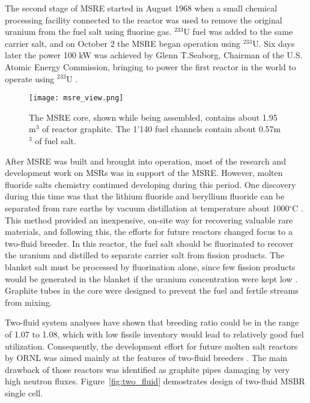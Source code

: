 The second stage of \gls{MSRE} started in August 1968 when a small chemical processing facility connected to the reactor was used to remove the original uranium from the fuel salt using fluorine gas. $^{233}$U fuel was added to the same carrier salt, and on October 2 the \gls{MSRE} began operation using $^{233}$U. Six days later the power 100 kW was achieved by Glenn T.Seaborg, Chairman of the U.S. Atomic Energy Commission, bringing to power the first reactor in the world to operate using $^{233}$U \cite{haubenreich_experience_1970}.

\begin{figure}[htp!] %
  \centering
  \vspace{-0.3em}
  \texttt{[image: msre\_view.png]}
  \caption{The \gls{MSRE} core, shown while being assembled, contains about 1.95 m$^3$ of reactor graphite. The 1'140 fuel channels contain about 0.57m$^3$ of fuel salt.}
  \vspace{-0.6em}
  \label{fig:msre}
\end{figure}
\FloatBarrier

After \gls{MSRE} was built and brought into operation, most of the research and development work on \glspl{MSR} was in support of the \gls{MSRE}. However, molten fluoride salts chemistry continued developing during this period. One discovery during this time was that the lithium fluoride and beryllium fluoride can be separated from rare earths by vacuum distillation at temperature about 1000$^{\circ}$C \cite{kelly_removal_1965}. This method provided an inexpensive, on-site way for recovering valuable rare materials, and following this, the efforts for future reactors changed focus to a two-fluid breeder. In this reactor, the fuel salt should be fluorinated to recover the uranium and distilled to separate carrier salt from fission products. The blanket salt must be processed by fluorination alone, since few fission products would be generated in the blanket if the uranium concentration were kept low \cite{rosenthal_molten-salt_1970}. Graphite tubes in the core were designed to prevent the fuel and fertile streams from mixing.

Two-fluid system analyses have shown that breeding ratio could be in the range of 1.07 to 1.08, which with low fissile inventory would lead to relatively good fuel utilization. Consequently, the development effort for future molten salt reactors by \gls{ORNL} was aimed mainly at the features of two-fluid breeders \cite{briggs_summary_1967}. The main drawback of those reactors was identified as graphite pipes damaging by very high neutron fluxes. Figure~\ref{fig:two_fluid} demostrates design of two-fluid \gls{MSBR} single cell.


